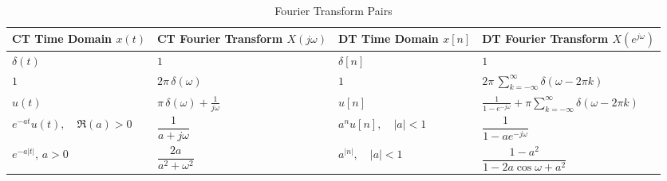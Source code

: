 \documentclass{article}
\begin{document}
\begin{multicols}{2}
    \begin{table*}[ht]
        \centering
        \caption{Fourier Transform Pairs}
        \label{tab:fourier_transform_pairs}
        \small
        \begin{tabular}{@{}llll@{}}
            \toprule
            \textbf{CT Time Domain} $x(t)$                                 & \textbf{CT Fourier Transform} $X(j\omega)$                                    & \textbf{DT Time Domain} $x[n]$                                          & \textbf{DT Fourier Transform} $X(e^{j\omega})$                                                                                      \\
            \midrule
            $\delta(t)$                                                    & $1$                                                                           & $\delta[n]$                                                             & $1$                                                                                                                                 \\ [1mm]
            $1$                                                            & $2\pi\,\delta(\omega)$                                                        & $1$                                                                     & $2\pi\,\sum_{k=-\infty}^{\infty}\delta(\omega-2\pi k)$                                                                              \\ [1mm]
            $u(t)$                                                         & $\pi\,\delta(\omega) + \frac{1}{j\omega}$                                     & $u[n]$                                                                  & $\frac{1}{1-e^{-j\omega}} + \pi \sum_{k=-\infty}^{\infty} \delta(\omega - 2\pi k)$                                                  \\ [1mm]
            $e^{-at}u(t),\quad \Re(a)>0$                                   & $\dfrac{1}{a+j\omega}$                                                        & $a^n u[n],\quad |a|<1$                                                  & $\dfrac{1}{1-ae^{-j\omega}}$                                                                                                        \\ [1mm]
            $e^{-a|t|},\, a>0$                                             & $\dfrac{2a}{a^2+\omega^2}$                                                    & $a^{|n|},\quad |a|<1$                                                   & $\dfrac{1-a^2}{1-2a\cos\omega+a^2}$                                                                                                 \\ [1mm]

\end{tabular}
\end{table*}
\end{multicols}
\end{document}
